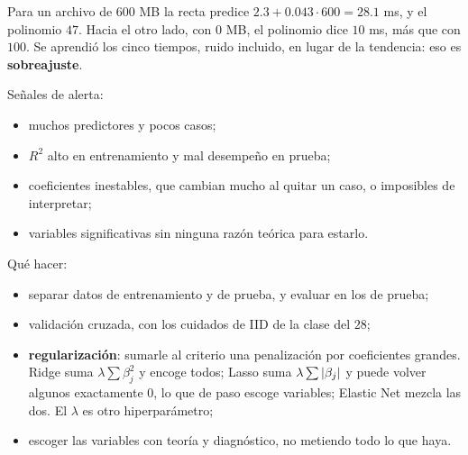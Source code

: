 \documentclass[11pt,letterpaper]{article}
\begin{document}
\begin{center}
\end{center}

Para un archivo de $600$ MB la recta predice
$2.3 + 0.043 \cdot 600 = 28.1$ ms, y el polinomio $47$. Hacia el otro
lado, con $0$ MB, el polinomio dice $10$ ms, más que con $100$. Se
aprendió los cinco tiempos, ruido incluido, en lugar de la tendencia:
eso es \textbf{sobreajuste}.

Señales de alerta:
\begin{itemize}[itemsep=0.3em]
    \item muchos predictores y pocos casos;
    \item $R^2$ alto en entrenamiento y mal desempeño en prueba;
    \item coeficientes inestables, que cambian mucho al quitar un caso,
          o imposibles de interpretar;
    \item variables significativas sin ninguna razón teórica para
          estarlo.
\end{itemize}

Qué hacer:
\begin{itemize}[itemsep=0.3em]
    \item separar datos de entrenamiento y de prueba, y evaluar en los
          de prueba;
    \item validación cruzada, con los cuidados de IID de la clase del
          $28$;
    \item \textbf{regularización}: sumarle al criterio una penalización
          por coeficientes grandes. Ridge suma $\lambda \sum \beta_j^2$
          y encoge todos; Lasso suma $\lambda \sum \left\lvert \beta_j \right\rvert$ y
          puede volver algunos exactamente $0$, lo que de paso escoge
          variables; Elastic Net mezcla las dos. El $\lambda$ es otro
          hiperparámetro;
    \item escoger las variables con teoría y diagnóstico, no metiendo
          todo lo que haya.
\end{itemize}
\end{document}
